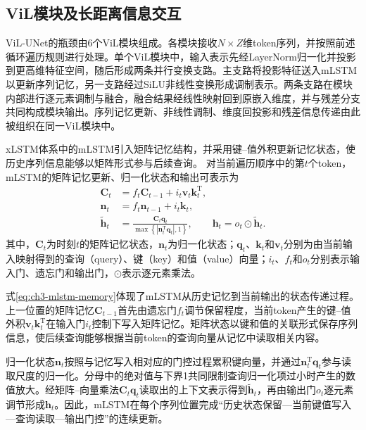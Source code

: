 \subsection{ViL模块及长距离信息交互}

ViL-UNet的瓶颈由6个ViL模块组成。各模块接收\(N\times Z\)维token序列，并按照前述循环遍历规则进行处理。单个ViL模块中，输入表示先经LayerNorm归一化并投影到更高维特征空间，随后形成两条并行变换支路。主支路将投影特征送入mLSTM以更新序列记忆，另一支路经过SiLU非线性变换形成调制表示。两条支路在模块内部进行逐元素调制与融合，融合结果经线性映射回到原嵌入维度，并与残差分支共同构成模块输出。序列记忆更新、非线性调制、维度回投影和残差信息传递由此被组织在同一ViL模块中。


xLSTM体系中的mLSTM引入矩阵记忆结构，并采用键--值外积更新记忆状态，使历史序列信息能够以矩阵形式参与后续查询。\cite{beck2024xlstm} 对当前遍历顺序中的第\(t\)个token，mLSTM的矩阵记忆更新、归一化状态和输出可表示为
\begin{equation}
\label{eq:ch3-mlstm-memory}
\begin{aligned}
\mathbf C_t &= f_t\mathbf C_{t-1}+i_t\mathbf v_t\mathbf k_t^{\mathrm T},\\
\mathbf n_t &= f_t\mathbf n_{t-1}+i_t\mathbf k_t,\\
\widetilde{\mathbf h}_t &=\frac{\mathbf C_t\mathbf q_t}{\max\left\{\left|\mathbf n_t^{\mathrm T}\mathbf q_t\right|,1\right\}},\qquad
\mathbf h_t=o_t\odot\widetilde{\mathbf h}_t .
\end{aligned}
\end{equation}
其中，\(\mathbf C_t\)为时刻\(t\)的矩阵记忆状态，\(\mathbf n_t\)为归一化状态；\(\mathbf q_t\)、\(\mathbf k_t\)和\(\mathbf v_t\)分别为由当前输入映射得到的查询（query）、键（key）和值（value）向量；\(i_t\)、\(f_t\)和\(o_t\)分别表示输入门、遗忘门和输出门，\(\odot\)表示逐元素乘法。

式\eqref{eq:ch3-mlstm-memory}体现了mLSTM从历史记忆到当前输出的状态传递过程。上一位置的矩阵记忆\(\mathbf C_{t-1}\)首先由遗忘门\(f_t\)调节保留程度，当前token产生的键--值外积\(\mathbf v_t\mathbf k_t^{\mathrm T}\)在输入门\(i_t\)控制下写入矩阵记忆。矩阵状态以键和值的关联形式保存序列信息，使后续查询能够根据当前token的查询向量从记忆中读取相关内容。

归一化状态\(\mathbf n_t\)按照与记忆写入相对应的门控过程累积键向量，并通过\(\mathbf n_t^{\mathrm T}\mathbf q_t\)参与读取尺度的归一化。分母中的绝对值与下界1共同限制查询归一化项过小时产生的数值放大。经矩阵--向量乘法\(\mathbf C_t\mathbf q_t\)读取出的上下文表示得到\(\widetilde{\mathbf h}_t\)，再由输出门\(o_t\)逐元素调节形成\(\mathbf h_t\)。因此，mLSTM在每个序列位置完成“历史状态保留—当前键值写入—查询读取—输出门控”的连续更新。

